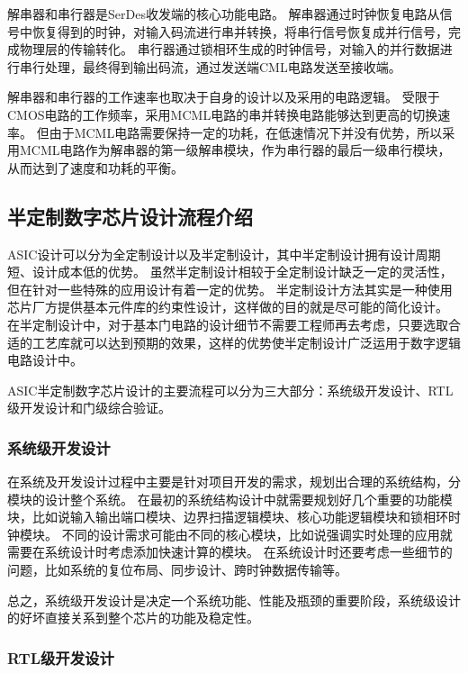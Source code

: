 \documentclass[UTF8]{ctexart}
\begin{document}
解串器和串行器是SerDes收发端的核心功能电路。
解串器通过时钟恢复电路从信号中恢复得到的时钟，对输入码流进行串并转换，将串行信号恢复成并行信号，完成物理层的传输转化。
串行器通过锁相环生成的时钟信号，对输入的并行数据进行串行处理，最终得到输出码流，通过发送端CML电路发送至接收端。

解串器和串行器的工作速率也取决于自身的设计以及采用的电路逻辑。
受限于CMOS电路的工作频率，采用MCML电路的串并转换电路能够达到更高的切换速率。
但由于MCML电路需要保持一定的功耗，在低速情况下并没有优势，所以采用MCML电路作为解串器的第一级解串模块，作为串行器的最后一级串行模块，从而达到了速度和功耗的平衡\cite{tanabe20010}。

\subsection{半定制数字芯片设计流程介绍}

ASIC设计可以分为全定制设计以及半定制设计，其中半定制设计拥有设计周期短、设计成本低的优势。
虽然半定制设计相较于全定制设计缺乏一定的灵活性，但在针对一些特殊的应用设计有着一定的优势。
半定制设计方法其实是一种使用芯片厂方提供基本元件库的约束性设计，这样做的目的就是尽可能的简化设计\cite{yaoyf2006}。
在半定制设计中，对于基本门电路的设计细节不需要工程师再去考虑，只要选取合适的工艺库就可以达到预期的效果，这样的优势使半定制设计广泛运用于数字逻辑电路设计中。

ASIC半定制数字芯片设计的主要流程可以分为三大部分：系统级开发设计、RTL级开发设计和门级综合验证。

\subsubsection{系统级开发设计}

在系统及开发设计过程中主要是针对项目开发的需求，规划出合理的系统结构，分模块的设计整个系统。
在最初的系统结构设计中就需要规划好几个重要的功能模块，比如说输入输出端口模块、边界扫描逻辑模块、核心功能逻辑模块和锁相环时钟模块。
不同的设计需求可能由不同的核心模块，比如说强调实时处理的应用就需要在系统设计时考虑添加快速计算的模块。
在系统设计时还要考虑一些细节的问题，比如系统的复位布局、同步设计、跨时钟数据传输等。

总之，系统级开发设计是决定一个系统功能、性能及瓶颈的重要阶段，系统级设计的好坏直接关系到整个芯片的功能及稳定性。

\subsubsection{RTL级开发设计}
\end{document}
